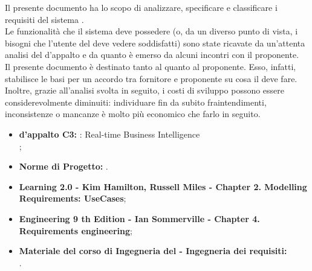 
		Il presente documento ha lo scopo di analizzare, specificare e classificare i requisiti del sistema .\\
		Le funzionalità che il sistema deve possedere (o, da un diverso punto di vista, i bisogni che l'utente del  deve vedere soddisfatti) sono state ricavate da un'attenta analisi del  d'appalto e da quanto è emerso da alcuni incontri con il proponente.\\
		Il presente documento è destinato tanto al \groupname{} quanto al proponente. Esso, infatti, stabilisce le basi per un accordo tra fornitore e proponente su cosa il  deve fare. Inoltre, grazie all'analisi svolta in seguito, i costi di sviluppo possono essere considerevolmente diminuiti: individuare fin da subito fraintendimenti, inconsistenze o mancanze è molto più economico che farlo in seguito.
	
	

		\begin{itemize}
			\item\textbf{ d'appalto C3:} \projectname{}: Real-time Business Intelligence \\
				;
			\item \textbf{Norme di Progetto:} .
		\end{itemize}
		\begin{itemize}
			\item \textbf{Learning  2.0 - Kim Hamilton, Russell Miles - Chapter 2. Modelling Requirements: UseCases};
			\item \textbf{ Engineering 9 th Edition - Ian Sommerville - Chapter 4. Requirements engineering};
			\item \textbf{Materiale del corso di Ingegneria del  - Ingegneria dei requisiti:} \\
				.
		\end{itemize}
